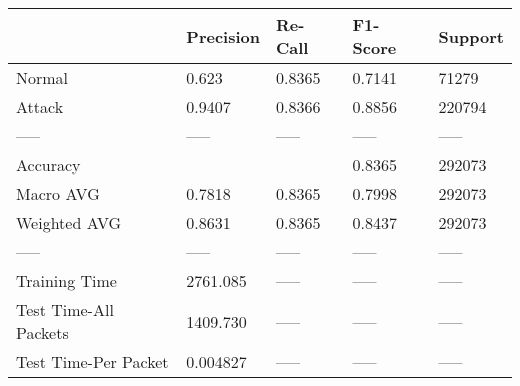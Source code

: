 \begin{tabular}{lllll}
\toprule
{} & Precision & Re-Call & F1-Score & Support \\
\midrule
Normal                &     0.623 &  0.8365 &   0.7141 &   71279 \\
Attack                &    0.9407 &  0.8366 &   0.8856 &  220794 \\
-----                 &     ----- &   ----- &    ----- &   ----- \\
Accuracy              &           &         &   0.8365 &  292073 \\
Macro AVG             &    0.7818 &  0.8365 &   0.7998 &  292073 \\
Weighted AVG          &    0.8631 &  0.8365 &   0.8437 &  292073 \\
-----                 &     ----- &   ----- &    ----- &   ----- \\
Training Time         &  2761.085 &   ----- &    ----- &   ----- \\
Test Time-All Packets &  1409.730 &   ----- &    ----- &   ----- \\
Test Time-Per Packet  &  0.004827 &   ----- &    ----- &   ----- \\
\bottomrule
\end{tabular}
